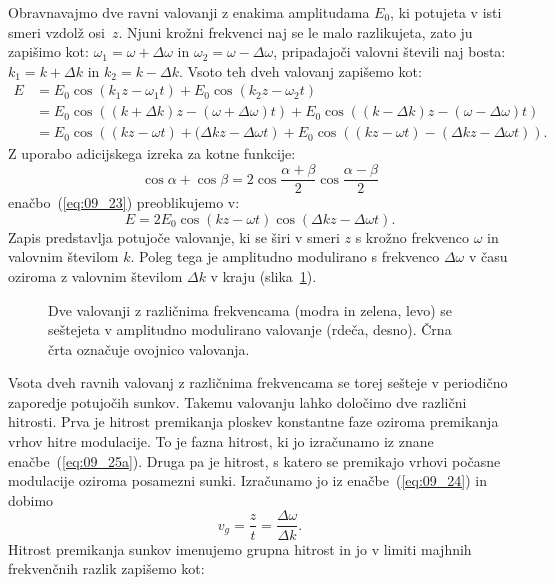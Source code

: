 Obravnavajmo dve ravni valovanji z enakima amplitudama $E_0$, ki potujeta v isti smeri vzdolž
osi~$z$. Njuni krožni frekvenci naj se le malo razlikujeta, zato ju zapišimo kot: 
$\omega_1=\omega + \Delta \omega$ in $\omega_2=\omega - \Delta \omega$, pripadajoči
valovni števili naj bosta: $k_1 = k + \Delta k $ in $k_2 = k - \Delta k$. 
Vsoto teh dveh valovanj zapišemo kot:
\begin{align}
E &= E_0 \cos (k_1z-\omega_1 t)+ E_0 \cos (k_2z-\omega_2 t) \nonumber\\
&= E_0 \cos\left((k+\Delta k)z-(\omega + \Delta \omega)t\right) 
+ E_0 \cos\left((k-\Delta k)z-(\omega - \Delta \omega)t\right)\nonumber \\
&= E_0 \cos\left((kz - \omega t) +(\Delta k z-\Delta \omega t\right)
+ E_0 \cos\left((k z - \omega t) - (\Delta k z- \Delta \omega t)  \right)\!. 
\label{eq:09_23}
\end{align}
Z uporabo adicijskega izreka za kotne funkcije:
\begin{equation}
\cos\alpha + \cos \beta = 2 \cos \frac{\alpha + \beta}{2} \cos \frac{\alpha - \beta}{2}
\end{equation}
enačbo~(\ref{eq:09_23}) preoblikujemo v:
\begin{equation}
E = 2E_0 \cos \left(kz - \omega t \right)\cos \left(\Delta kz - \Delta \omega t \right)\!.
\label{eq:09_24}
\end{equation}
Zapis predstavlja potujoče valovanje, ki se širi v smeri $z$ s krožno 
frekvenco $\omega$ in valovnim številom $k$. Poleg tega je amplitudno modulirano s frekvenco
$\Delta \omega$ v času oziroma z valovnim številom $\Delta k$ v kraju (slika~\ref{fig:09_utripanje}). 
\begin{figure}[ht]
\centering
\def\svgwidth{140truemm} 

\caption{Dve valovanji z različnima frekvencama (modra in zelena, levo) se seštejeta
v amplitudno modulirano valovanje (rdeča, desno). Črna črta označuje ovojnico valovanja.}
\label{fig:09_utripanje}
\end{figure} 

Vsota dveh ravnih valovanj z različnima frekvencama se torej sešteje v periodično zaporedje
potujočih sunkov. Takemu valovanju lahko določimo dve
različni hitrosti. Prva je hitrost premikanja ploskev konstantne
faze oziroma premikanja vrhov hitre modulacije. To je fazna hitrost, ki
jo izračunamo iz znane enačbe~(\ref{eq:09_25a}). Druga pa je hitrost, s katero
se premikajo vrhovi počasne modulacije oziroma posamezni sunki. Izračunamo jo
iz enačbe~(\ref{eq:09_24}) in dobimo 
\begin{equation}
v_g=\frac{z}{t} = \frac{\Delta \omega}{\Delta k}.
\end{equation}
Hitrost premikanja sunkov imenujemo grupna hitrost in jo
v limiti majhnih frekvenčnih razlik zapišemo kot:

